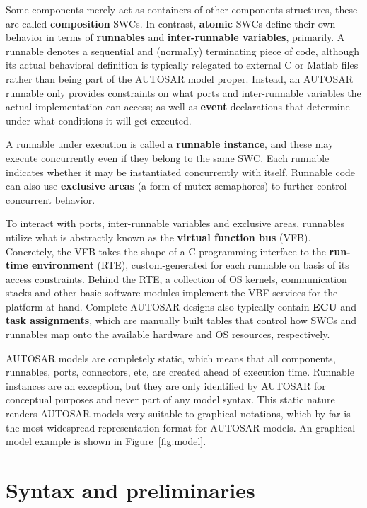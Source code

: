 \documentclass[twocolumn]{article}
\begin{document}
Some components merely act as containers of other components structures, these are called {\bf composition} SWCs. In contrast, {\bf atomic} SWCs define their own behavior in terms of {\bf runnables} and {\bf inter-runnable variables}, primarily. A runnable denotes a sequential and (normally) terminating piece of code, although its actual behavioral definition is typically relegated to external C or Matlab files rather than being part of the AUTOSAR model proper. Instead, an AUTOSAR runnable  only provides constraints on what ports and inter-runnable variables the actual implementation can access; as well as {\bf event} declarations that determine under what conditions it will get executed.

A runnable under execution is called a {\bf runnable instance}, and these may execute concurrently even if they belong to the same SWC. Each runnable indicates whether it may be instantiated concurrently with itself. Runnable code can also use {\bf exclusive areas} (a form of mutex semaphores) to further control concurrent behavior.

To interact with ports, inter-runnable variables and exclusive areas, runnables utilize what is abstractly known as the {\bf virtual function bus} (VFB). Concretely, the VFB takes the shape of a C programming interface to the {\bf run-time environment} (RTE), custom-generated for each runnable on basis of its access constraints. Behind the RTE, a collection of OS kernels, communication stacks and other basic software modules implement the VBF services for the platform at hand. Complete AUTOSAR designs also typically contain {\bf ECU} and {\bf task assignments}, which are manually built tables that control how SWCs and runnables map onto the available hardware and OS resources, respectively.

AUTOSAR models are completely static, which means that all components, runnables, ports, connectors, etc, are created ahead of execution time. Runnable instances are an exception, but they are only identified by AUTOSAR for conceptual purposes and never part of any model syntax. This static nature renders AUTOSAR models very suitable to graphical notations, which by far is the most widespread representation format for AUTOSAR models. An graphical model example is shown in Figure~\ref{fig:model}.

\section{Syntax and preliminaries}
\label{sec:Calc}
\end{document}
